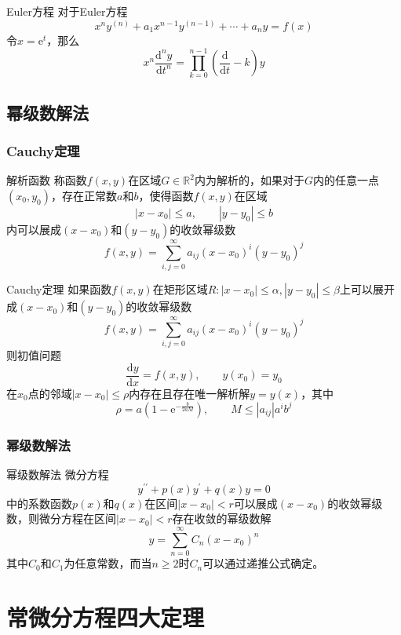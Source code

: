 \documentclass[lang = cn, scheme = chinese, thmcnt = section]{elegantbook}
\newcommand{\R}{\mathbb{R}}            %
\newcommand{\dd}{\mathrm{d}}           %
\newcommand{\ee}[1]{\mathrm{e}^{#1}}           %
\begin{document}
\begin{theorem}{Euler方程}
	对于Euler方程%
	$$
	x^ny^{(n)}+a_1x^{n-1}y^{(n-1)}+\cdots+a_ny=f(x)
	$$
	令$x=\ee{t}$，那么%
	$$
	x^n\frac{\dd^n y}{\dd t^n}
	=\prod_{k=0}^{n-1}\left(\frac{\dd}{\dd t}-k\right)y
	$$
\end{theorem}

\section{幂级数解法}

\subsection{Cauchy定理}

\begin{definition}{解析函数}
	称函数$f(x,y)$在区域$G\in{\R}^2$内为解析的，如果对于$G$内的任意一点$(x_0,y_0)$，存在正常数$a$和$b$，使得函数$f(x,y)$在区域
	$$
	|x-x_0|\le a,\qquad
	|y-y_0|\le b
	$$
	内可以展成$(x-x_0)$和$(y-y_0)$的收敛幂级数
	$$
	f(x,y)=\sum_{i,j=0}^{\infty}{a_{ij}(x-x_0)^i(y-y_0)^j}
	$$
\end{definition}

\begin{theorem}{Cauchy定理}
	如果函数$f(x,y)$在矩形区域$R:|x-x_0|\le\alpha,|y-y_0|\le\beta$上可以展开成$(x-x_0)$和$(y-y_0)$的收敛幂级数
	$$
	f(x,y)=\sum_{i,j=0}^{\infty}{a_{ij}(x-x_0)^i(y-y_0)^j}
	$$
	则初值问题
	$$
	\frac{\mathrm{d}y}{\mathrm{d}x}=f(x,y),\qquad 
	y(x_0)=y_0
	$$
	在$x_0$点的邻域$|x-x_0|\le\rho$内存在且存在唯一解析解$y=y(x)$，其中
	$$
	\rho=a(1-\mathrm{e}^{-\frac{b}{2aM}}),\qquad 
	M\le|a_{ij}|a^ib^j
	$$
\end{theorem}

\subsection{幂级数解法}

\begin{theorem}{幂级数解法}
	微分方程
	$$
	y^{\prime\prime}+p(x)y^{\prime}+q(x)y=0
	$$
	中的系数函数$p(x)$和$q(x)$在区间$|x-x_0|<r$可以展成$(x-x_0)$的收敛幂级数，则微分方程在区间$|x-x_0|<r$存在收敛的幂级数解
	$$
	y=\sum_{n=0}^{\infty}{C_n(x-x_0)^n}
	$$
	其中$C_0$和$C_1$为任意常数，而当$n\ge2$时$C_n$可以通过递推公式确定。
\end{theorem}

\chapter{常微分方程四大定理}
\end{document}
